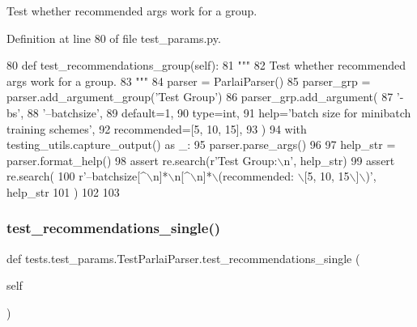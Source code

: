 \begin{DoxyVerb}Test whether recommended args work for a group.
\end{DoxyVerb}
 

Definition at line 80 of file test\+\_\+params.\+py.


\begin{DoxyCode}
80     \textcolor{keyword}{def }test\_recommendations\_group(self):
81         \textcolor{stringliteral}{"""}
82 \textcolor{stringliteral}{        Test whether recommended args work for a group.}
83 \textcolor{stringliteral}{        """}
84         parser = ParlaiParser()
85         parser\_grp = parser.add\_argument\_group(\textcolor{stringliteral}{'Test Group'})
86         parser\_grp.add\_argument(
87             \textcolor{stringliteral}{'-bs'},
88             \textcolor{stringliteral}{'--batchsize'},
89             default=1,
90             type=int,
91             help=\textcolor{stringliteral}{'batch size for minibatch training schemes'},
92             recommended=[5, 10, 15],
93         )
94         with testing\_utils.capture\_output() \textcolor{keyword}{as} \_:
95             parser.parse\_args()
96 
97         help\_str = parser.format\_help()
98         \textcolor{keyword}{assert} re.search(\textcolor{stringliteral}{r'Test Group:\(\backslash\)n'}, help\_str)
99         \textcolor{keyword}{assert} re.search(
100             \textcolor{stringliteral}{r'--batchsize[^\(\backslash\)n]*\(\backslash\)n[^\(\backslash\)n]*\(\backslash\)(recommended: \(\backslash\)[5, 10, 15\(\backslash\)]\(\backslash\))'}, help\_str
101         )
102 
103 
\end{DoxyCode}
\mbox{\label{classtests_1_1test__params_1_1TestParlaiParser_aa34d539da2370132f7a4974008422f55}} 
\subsubsection{\texorpdfstring{test\+\_\+recommendations\+\_\+single()}{test\_recommendations\_single()}}
{\footnotesize\ttfamily def tests.\+test\+\_\+params.\+Test\+Parlai\+Parser.\+test\+\_\+recommendations\+\_\+single (\begin{DoxyParamCaption}\item[{}]{self }\end{DoxyParamCaption})}


